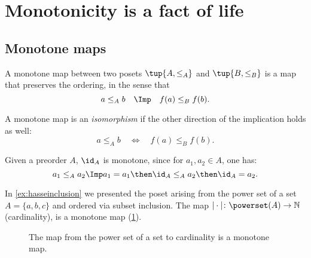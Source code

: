 \section{Monotonicity is a fact of life}
\subsection{Monotone maps}
\begin{definition}
A monotone map between two posets
$\tup{A, \leq_A}$ and $\tup{B, \leq_B}$ is a map that preserves the ordering, in the sense that 
\begin{equation}
 a \leq_A b \quad \Imp \quad f(a) \leq_B f(b).
\end{equation}

\noindent A monotone map is an \emph{isomorphism} if the other direction
of the implication holds as well:
\begin{equation}
 a \leq_A b \quad \Leftrightarrow \quad f(a) \leq_B f(b).
\end{equation}
\end{definition}
\begin{remark}
Given a preorder $A$, $\id_A$ is monotone, since for $a_1,a_2\in A$, one has:
\begin{equation}
a_1\leq_A a_2 \Imp a_1=a_1\then \id_A \leq_A a_2\then \id_A = a_2.
\end{equation}
\end{remark}



\begin{example}
In \cref{ex:hasseinclusion} we presented the poset arising from the power set of a set $A=\{a,b,c\}$ and ordered via subset inclusion. The map $\vert \cdot \vert \colon \powerset(A)\to \mathbb{N}$ (cardinality), is a monotone map (\cref{fig:cardinality}).
\begin{figure}[h!]
\begin{center}
\end{center}
\caption{The map from the power set of a set to cardinality is a monotone map. \label{fig:cardinality}}
\end{figure}
\end{example}

